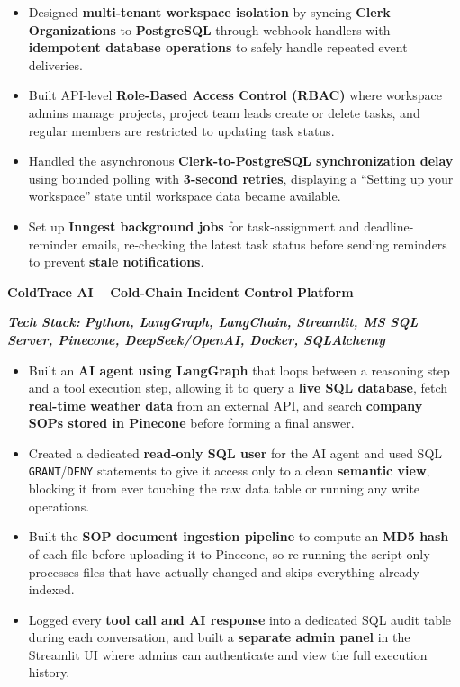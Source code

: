 \documentclass[10pt,a4paper]{article}
\newcommand{\resumeItem}[1]{
    \item \textrelsize{+0.5} #1
}
\newcommand{\resumeSubheading}[4]{
    \vspace{1pt}
    \textbf{#1} \hfill \textbf{#2}\\
    \textit{\small #3} \hfill \textit{\small #4}
    \vspace{1pt}
}
\begin{document}
\begin{itemize}

    \resumeItem{Designed \textbf{multi-tenant workspace isolation} by syncing \textbf{Clerk Organizations} to \textbf{PostgreSQL} through webhook handlers with \textbf{idempotent database operations} to safely handle repeated event deliveries.}

    \resumeItem{Built API-level \textbf{Role-Based Access Control (RBAC)} where workspace admins manage projects, project team leads create or delete tasks, and regular members are restricted to updating task status.}

    \resumeItem{Handled the asynchronous \textbf{Clerk-to-PostgreSQL synchronization delay} using bounded polling with \textbf{3-second retries}, displaying a ``Setting up your workspace'' state until workspace data became available.}

    \resumeItem{Set up \textbf{Inngest background jobs} for task-assignment and deadline-reminder emails, re-checking the latest task status before sending reminders to prevent \textbf{stale notifications}.}

\end{itemize}


\resumeSubheading
{ColdTrace AI -- Cold-Chain Incident Control Platform}
{}
{}
{}

\vspace{-4pt}
{\small
\textit{\textbf{Tech Stack:}
\textbf{Python, LangGraph, LangChain, Streamlit, MS SQL Server, Pinecone, DeepSeek/OpenAI, Docker, SQLAlchemy}}
}

\begin{itemize}

    \resumeItem{Built an \textbf{AI agent using LangGraph} that loops between a reasoning step and a tool execution step, allowing it to query a \textbf{live SQL database}, fetch \textbf{real-time weather data} from an external API, and search \textbf{company SOPs stored in Pinecone} before forming a final answer.}

    \resumeItem{Created a dedicated \textbf{read-only SQL user} for the AI agent and used SQL \texttt{GRANT}/\texttt{DENY} statements to give it access only to a clean \textbf{semantic view}, blocking it from ever touching the raw data table or running any write operations.}

    \resumeItem{Built the \textbf{SOP document ingestion pipeline} to compute an \textbf{MD5 hash} of each file before uploading it to Pinecone, so re-running the script only processes files that have actually changed and skips everything already indexed.}

    \resumeItem{Logged every \textbf{tool call and AI response} into a dedicated SQL audit table during each conversation, and built a \textbf{separate admin panel} in the Streamlit UI where admins can authenticate and view the full execution history.}

\end{itemize}
\end{document}
